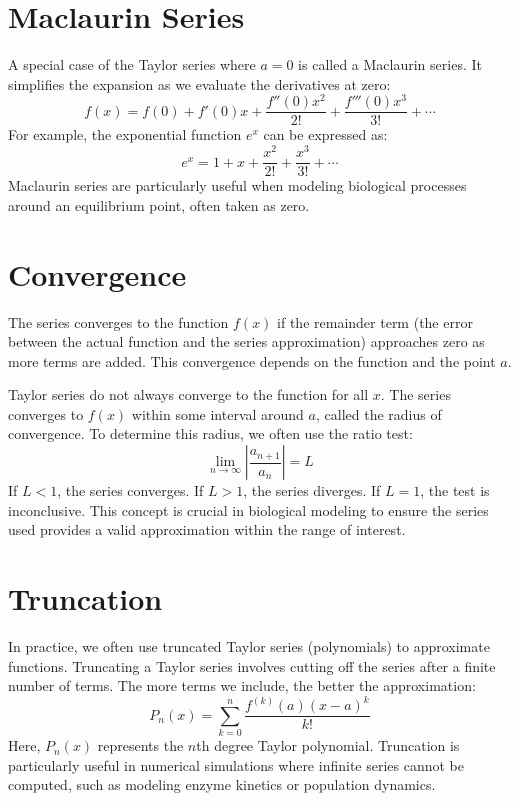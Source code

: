 \documentclass{article}
\begin{document}
\section{Maclaurin Series}
A special case of the Taylor series where $a = 0$ is called a Maclaurin series. It simplifies the expansion as we evaluate the derivatives at zero:
\begin{equation}
f(x) = f(0) + f'(0)x + \frac{f''(0)x^2}{2!} + \frac{f'''(0)x^3}{3!} + \cdots
\end{equation}
For example, the exponential function $e^x$ can be expressed as:
\begin{equation}
e^x = 1 + x + \frac{x^2}{2!} + \frac{x^3}{3!} + \cdots
\end{equation}
Maclaurin series are particularly useful when modeling biological processes around an equilibrium point, often taken as zero.

\section{Convergence}
The series converges to the function \( f(x) \) if the remainder term (the error between the actual function and the series approximation) approaches zero as more terms are added. This convergence depends on the function and the point \( a \).

Taylor series do not always converge to the function for all $x$. The series converges to $f(x)$ within some interval around $a$, called the radius of convergence. To determine this radius, we often use the ratio test:
\begin{equation}
\lim_{n \to \infty} \left| \frac{a_{n+1}}{a_n} \right| = L
\end{equation}
If $L < 1$, the series converges. If $L > 1$, the series diverges. If $L = 1$, the test is inconclusive. This concept is crucial in biological modeling to ensure the series used provides a valid approximation within the range of interest.

\section{Truncation}
In practice, we often use truncated Taylor series (polynomials) to approximate functions. Truncating a Taylor series involves cutting off the series after a finite number of terms. The more terms we include, the better the approximation:
\begin{equation}
P_n(x) = \sum_{k=0}^{n} \frac{f^{(k)}(a)(x-a)^k}{k!}
\end{equation}
Here, $P_n(x)$ represents the $n$th degree Taylor polynomial. Truncation is particularly useful in numerical simulations where infinite series cannot be computed, such as modeling enzyme kinetics or population dynamics.
\end{document}
